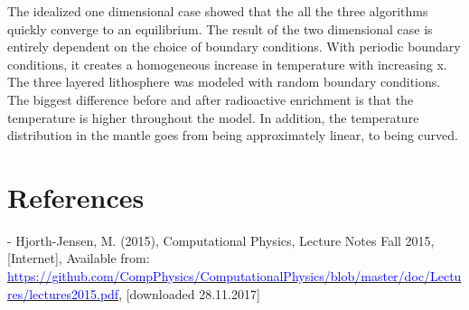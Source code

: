 \documentclass[10pt,a4paper]{article}
\begin{document}
\noindent The idealized one dimensional case showed that the all the three algorithms quickly converge to an equilibrium. The result of the two dimensional case is entirely dependent on the choice of boundary conditions. With periodic boundary conditions, it creates a homogeneous increase in temperature with increasing x. The three layered lithosphere was modeled with random boundary conditions. The biggest difference before and after radioactive enrichment is that the temperature is higher throughout the model. In addition, the temperature distribution in the mantle goes from being approximately linear, to being curved.  




\newpage
\section*{References}

\noindent - Hjorth-Jensen, M. (2015), Computational Physics, Lecture Notes Fall 2015, [Internet], Available from: \href{https://github.com/CompPhysics/ComputationalPhysics/blob/master/doc/Lectures/lectures2015.pdf}{\textcolor{blue}{https://github.com/CompPhysics/ComputationalPhysics/blob/master/doc/Lectures/lectures2015.pdf}}, [downloaded 28.11.2017]
\end{document}
